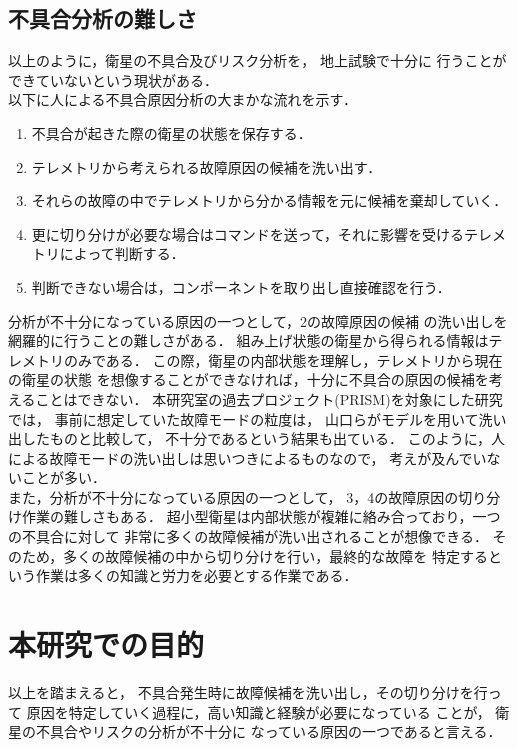 \documentclass[11pt]{article}
\begin{document}
\subsection{不具合分析の難しさ}
以上のように，衛星の不具合及びリスク分析を，
地上試験で十分に
行うことができていないという現状がある．\\
以下に人による不具合原因分析の大まかな流れを示す．
\begin{enumerate}
   \item 不具合が起きた際の衛星の状態を保存する． %
   \item テレメトリから考えられる故障原因の候補を洗い出す．
   \item それらの故障の中でテレメトリから分かる情報を元に候補を棄却していく．
   \item 更に切り分けが必要な場合はコマンドを送って，それに影響を受けるテレメトリによって判断する．
   \item 判断できない場合は，コンポーネントを取り出し直接確認を行う．
\end{enumerate}
分析が不十分になっている原因の一つとして，2の故障原因の候補
の洗い出しを網羅的に行うことの難しさがある．
組み上げ状態の衛星から得られる情報はテレメトリのみである．
この際，衛星の内部状態を理解し，テレメトリから現在の衛星の状態
を想像することができなければ，十分に不具合の原因の候補を考えることはできない．
本研究室の過去プロジェクト(PRISM)を対象にした研究では，
事前に想定していた故障モードの粒度は，
山口ら\cite{Yamaguchi2014}がモデルを用いて洗い出したものと比較して，
不十分であるという結果も出ている．
このように，人による故障モードの洗い出しは思いつきによるものなので，
考えが及んでいないことが多い．\\
また，分析が不十分になっている原因の一つとして，
3，4の故障原因の切り分け作業の難しさもある．
超小型衛星は内部状態が複雑に絡み合っており，一つの不具合に対して
非常に多くの故障候補が洗い出されることが想像できる．
そのため，多くの故障候補の中から切り分けを行い，最終的な故障を
特定するという作業は多くの知識と労力を必要とする作業である．


\section{本研究での目的}
以上を踏まえると，
不具合発生時に故障候補を洗い出し，その切り分けを行って
原因を特定していく過程に，高い知識と経験が必要になっている
ことが，
衛星の不具合やリスクの分析が不十分に
なっている原因の一つであると言える．
\end{document}
